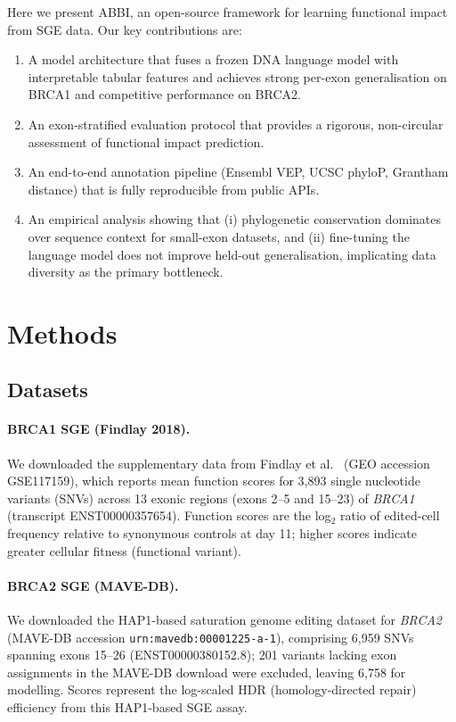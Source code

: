 \documentclass[12pt]{article}
\newcommand{\abbi}{\textsc{ABBI}}
\begin{document}
Here we present \abbi{}, an open-source framework for learning functional impact from
SGE data.
Our key contributions are:
\begin{enumerate}
  \item A model architecture that fuses a frozen DNA language model with interpretable
        tabular features and achieves strong per-exon generalisation on BRCA1 and
        competitive performance on BRCA2.
  \item An exon-stratified evaluation protocol that provides a rigorous, non-circular
        assessment of functional impact prediction.
  \item An end-to-end annotation pipeline (Ensembl VEP, UCSC phyloP, Grantham distance)
        that is fully reproducible from public APIs.
  \item An empirical analysis showing that (i) phylogenetic conservation dominates over
        sequence context for small-exon datasets, and (ii) fine-tuning the language model
        does not improve held-out generalisation, implicating data diversity as the
        primary bottleneck.
\end{enumerate}

\section{Methods}
\label{sec:methods}

\subsection{Datasets}

\paragraph{BRCA1 SGE (Findlay 2018).}
We downloaded the supplementary data from Findlay et al.~\citep{findlay2018}
(GEO accession GSE117159), which reports mean function scores for 3{,}893 single
nucleotide variants (SNVs) across 13 exonic regions (exons 2--5 and 15--23) of \emph{BRCA1}
(transcript ENST00000357654).
Function scores are the log$_2$ ratio of edited-cell frequency relative to synonymous
controls at day 11; higher scores indicate greater cellular fitness (functional variant).

\paragraph{BRCA2 SGE (MAVE-DB).}
We downloaded the HAP1-based saturation genome editing dataset for \emph{BRCA2}
(MAVE-DB accession \texttt{urn:mavedb:00001225-a-1}), comprising 6{,}959 SNVs spanning exons 15--26 (ENST00000380152.8);
201 variants lacking exon assignments in the MAVE-DB download were excluded,
leaving 6{,}758 for modelling.
Scores represent the log-scaled HDR (homology-directed repair) efficiency
from this HAP1-based SGE assay.
\end{document}
